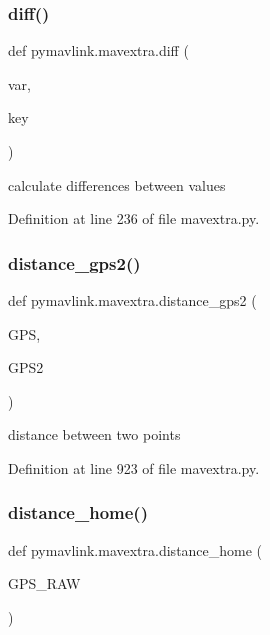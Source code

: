 \mbox{\label{namespacepymavlink_1_1mavextra_ab3215121238bdf76cb714ad349d6a17b}} 
\subsubsection{\texorpdfstring{diff()}{diff()}}
{\footnotesize\ttfamily def pymavlink.\+mavextra.\+diff (\begin{DoxyParamCaption}\item[{}]{var,  }\item[{}]{key }\end{DoxyParamCaption})}

\begin{DoxyVerb}calculate differences between values\end{DoxyVerb}
 

Definition at line 236 of file mavextra.\+py.

\mbox{\label{namespacepymavlink_1_1mavextra_a4967f5a9f9d809005b0c7ec3ee25415c}} 
\subsubsection{\texorpdfstring{distance\_gps2()}{distance\_gps2()}}
{\footnotesize\ttfamily def pymavlink.\+mavextra.\+distance\+\_\+gps2 (\begin{DoxyParamCaption}\item[{}]{G\+PS,  }\item[{}]{G\+P\+S2 }\end{DoxyParamCaption})}

\begin{DoxyVerb}distance between two points\end{DoxyVerb}
 

Definition at line 923 of file mavextra.\+py.

\mbox{\label{namespacepymavlink_1_1mavextra_a263fad301c730511059b3c9bb58248d8}} 
\subsubsection{\texorpdfstring{distance\_home()}{distance\_home()}}
{\footnotesize\ttfamily def pymavlink.\+mavextra.\+distance\+\_\+home (\begin{DoxyParamCaption}\item[{}]{G\+P\+S\+\_\+\+R\+AW }\end{DoxyParamCaption})}

